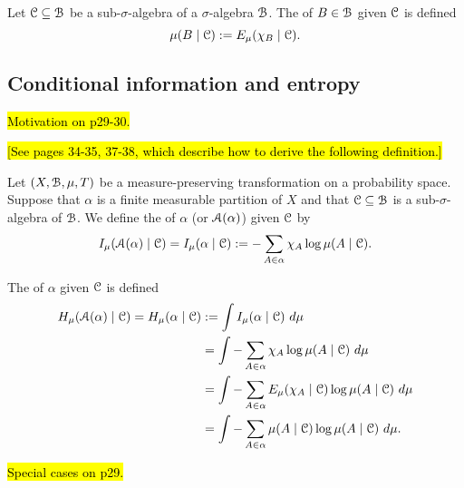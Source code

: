 \begin{definition}
	Let $\mathcal{C} \subseteq \mathcal{B}$ be a sub-$\sigma$-algebra of a $\sigma$-algebra $\mathcal{B}$. The  of $B \in \mathcal{B}$ given $\mathcal{C}$ is defined
	\[
		\mu(B \mid \mathcal{C}) := E_\mu(\chi_B \mid \mathcal{C}).
	\]
\end{definition}

\subsection{Conditional information and entropy}
\hl{Motivation on p29-30.}

\hl{[See pages 34-35, 37-38, which describe how to derive the following definition.]}

\begin{definition}
	Let $(X, \mathcal{B}, \mu, T)$ be a measure-preserving transformation on a probability space. Suppose that $\alpha$ is a finite measurable partition of $X$ and that $\mathcal{C} \subseteq \mathcal{B}$ is a sub-$\sigma$-algebra of $\mathcal{B}$. We define the  of $\alpha$ (or $\mathcal{A}(\alpha)$) given $\mathcal{C}$ by
	\[
		I_\mu(\mathcal{A}(\alpha) \mid \mathcal{C}) = I_\mu(\alpha \mid \mathcal{C}) := -\sum_{A \in \alpha}{\chi_A \log{\mu(A \mid \mathcal{C})}}.
	\]
	
	The  of $\alpha$ given $\mathcal{C}$ is defined
	\begin{align*}
		H_\mu(\mathcal{A}(\alpha) \mid \mathcal{C}) = H_\mu(\alpha \mid \mathcal{C}) &:= \int{I_\mu(\alpha \mid \mathcal{C})\ d\mu} \\
			&= \int{-\sum_{A \in \alpha}{\chi_A \log{\mu(A \mid \mathcal{C})}}\ d\mu} \\
			&= \int{-\sum_{A \in \alpha}{E_\mu(\chi_A \mid \mathcal{C}) \log{\mu(A \mid \mathcal{C})}}\ d\mu} \\
			&= \int{-\sum_{A \in \alpha}{\mu(A \mid \mathcal{C}) \log{\mu(A \mid \mathcal{C})}}\ d\mu}.
	\end{align*}
\end{definition}

\hl{Special cases on p29.}

